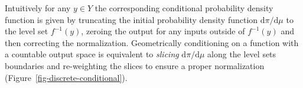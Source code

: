 \documentclass[
  letterpaper,
  DIV=11,
  numbers=noendperiod]{scrartcl}
\begin{document}
Intuitively for any \(y \in Y\) the corresponding conditional
probability density function is given by truncating the initial
probability density function \(\mathrm{d} \pi / \mathrm{d} \mu\) to the
level set \(f^{-1}(y)\), zeroing the output for any inputs outside of
\(f^{-1}(y)\) and then correcting the normalization. Geometrically
conditioning on a function with a countable output space is equivalent
to \emph{slicing} \(\mathrm{d} \pi / \mathrm{d} \mu\) along the level
sets boundaries and re-weighting the slices to ensure a proper
normalization (Figure~\ref{fig-discrete-conditional}).

\begin{figure}

\begin{minipage}{0.05\linewidth}
~\end{minipage}%
%
\begin{minipage}{0.45\linewidth}


\subcaption{\label{fig-discrete-conditional-initial}}

\end{minipage}%
%
\begin{minipage}{0.45\linewidth}

\centering{

}
\end{minipage}
\end{figure}
\end{document}
